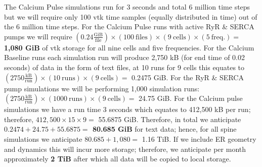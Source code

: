 The Calcium Pulse simulations run for 3 seconds and total 6 million time steps but we will require only 100 vtk time samples (equally distributed in time) out of the 6 million time steps. For the Calcium Pulse runs with active RyR \& SERCA pumps we will require $\left(0.24\frac{\text{GiB}}{\text{file}}\right)\times (100\ \text{files}) \times (9\ \text{cells})\times (5\ \text{freq.})=$ \textbf{1,080 GiB} of vtk storage for all nine cells and five frequencies. For the Calcium Baseline runs each simulation run will produce 2,750 kB (for end time of 0.02 seconds) of data in the form of text files, at 10 runs for 9 cells this equates to $\left(2750\frac{\text{kB}}{\text{run}}\right)\times (10\ \text{runs})\times (9\ \text{cells}) = $ 0.2475 GiB. For the RyR \& SERCA pump simulations we will be performing 1,000 simulation runs: $\left(2750\frac{\text{kB}}{\text{run}}\right)\times (1000\ \text{runs})\times (9\ \text{cells}) = $ 24.75 GiB. For the Calcium pulse simulations we have a run time 3 seconds which equates to 412,500 kB per run; therefore, $412,500\times 15\times 9 = $ 55.6875 GiB. Therefore, in total we anticipate \textbf{$0.2474+24.75+55.6875=$ 80.685 GiB} for text data; hence, for all spine simulations we anticipate $80.685 + 1,080 = $ 1.16 TiB. If we include ER geometry and dynamics this will incur more storage; therefore, we anticipate per month approximately \textbf{2 TiB} after which all data will be copied to local storage.
